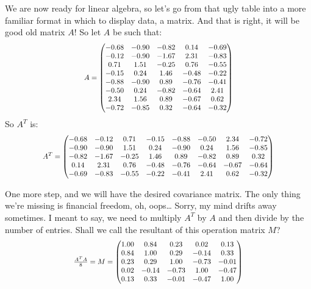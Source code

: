 \documentclass[600paper, 11pt,twoside,openany]{kdp}
\begin{document}
\indent We are now ready for linear algebra, so let’s go from that ugly table into a more familiar format in which to display data, a matrix. And that is right, it will be good old matrix $A$! So let $A$ be such that:
\[ \scalebox{.85}{$\displaystyle A = 
\begin{pmatrix}
 -0.68 &     -0.90 &  -0.82 &   0.14 & -0.69 \\
 -0.12 &     -0.90 &  -1.67 &   2.31 &  -0.83 \\ 
  0.71 &      1.51 &  -0.25 &  0.76 &  -0.55 \\ 
 -0.15 &      0.24 &   1.46 &  -0.48 &  -0.22 \\ 
 -0.88 &     -0.90 &   0.89 &   -0.76 &  -0.41 \\ 
 -0.50 &      0.24 &   -0.82 &  -0.64 &   2.41 \\ 
  2.34 &      1.56 &    0.89 &  -0.67 &   0.62 \\ 
 -0.72 &     -0.85 &    0.32 &  -0.64 &   -0.32 \\ 
\end{pmatrix}$}
\]
\indent So $A^T$ is: 
\[\scalebox{.85}{$\displaystyle A^T = 
\begin{pmatrix}
 -0.68 & -0.12 &  0.71 & -0.15 & -0.88 & -0.50 &  2.34 & -0.72 \\
-0.90 & -0.90 &  1.51 &  0.24 & -0.90 &  0.24 &  1.56 & -0.85 \\
-0.82 & -1.67 & -0.25 &  1.46 &  0.89 & -0.82 &  0.89 &  0.32 \\
 0.14 &  2.31 &  0.76 & -0.48 & -0.76 & -0.64 & -0.67 & -0.64 \\
-0.69 & -0.83 & -0.55 & -0.22 & -0.41 &  2.41 &  0.62 & -0.32 \\
\end{pmatrix}$}
\]

\indent One more step, and we will have the desired covariance matrix. The only thing we’re missing is financial freedom, oh, oops… Sorry, my mind drifts away sometimes. I meant to say, we need to multiply $A^T$ by $A$ and then divide by the number of entries. Shall we call the resultant of this operation matrix $M$?
\[  \scalebox{.85}{$\frac{A^TA}{8} = M = 
\begin{pmatrix}
1.00 &  0.84 &  0.23 &  0.02 &  0.13 \\
0.84 &  1.00 &  0.29 & -0.14 &  0.33 \\
0.23 &  0.29 &  1.00 & -0.73 & -0.01 \\
0.02 & -0.14 & -0.73 &  1.00 & -0.47 \\
0.13 &  0.33 & -0.01 & -0.47 &  1.00 \\
\end{pmatrix}$}
\]
\end{document}
